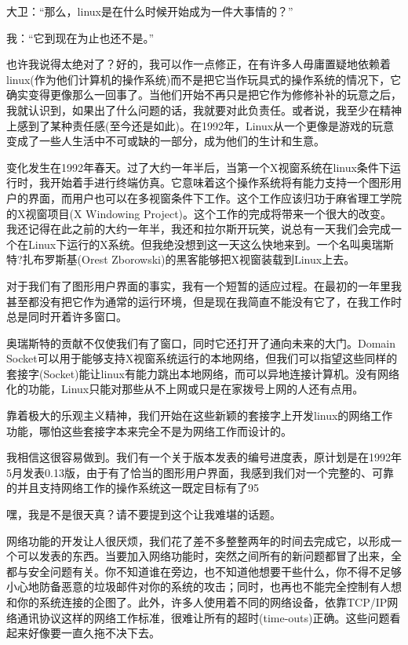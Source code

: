 大卫：“那么，linux是在什么时候开始成为一件大事情的？”

我：“它到现在为止也还不是。”

 

也许我说得太绝对了？好的，我可以作一点修正，在有许多人毋庸置疑地依赖着linux(作为他们计算机的操作系统)而不是把它当作玩具式的操作系统的情况下，它确实变得更像那么一回事了。当他们开始不再只是把它作为修修补补的玩意之后，我就认识到，如果出了什么问题的话，我就要对此负责任。或者说，我至少在精神上感到了某种责任感(至今还是如此)。在1992年，Linux从一个更像是游戏的玩意变成了一些人生活中不可或缺的一部分，成为他们的生计和生意。

 

变化发生在1992年春天。过了大约一年半后，当第一个X视窗系统在linux条件下运行时，我开始着手进行终端仿真。它意味着这个操作系统将有能力支持一个图形用户的界面，而用户也可以在多视窗条件下工作。这个工作应该归功于麻省理工学院的X视窗项目(X Windowing Project)。这个工作的完成将带来一个很大的改变。我还记得在此之前的大约一年半，我还和拉尔斯开玩笑，说总有一天我们会完成一个在Linux下运行的X系统。但我绝没想到这一天这么快地来到。一个名叫奥瑞斯特?扎布罗斯基(Orest Zborowski)的黑客能够把X视窗装载到Linux上去。

对于我们有了图形用户界面的事实，我有一个短暂的适应过程。在最初的一年里我甚至都没有把它作为通常的运行环境，但是现在我简直不能没有它了，在我工作时总是同时开着许多窗口。

奥瑞斯特的贡献不仅使我们有了窗口，同时它还打开了通向未来的大门。Domain Socket可以用于能够支持X视窗系统运行的本地网络，但我们可以指望这些同样的套接字(Socket)能让linux有能力跳出本地网络，而可以异地连接计算机。没有网络化的功能，Linux只能对那些从不上网或只是在家拨号上网的人还有点用。

靠着极大的乐观主义精神，我们开始在这些新颖的套接字上开发linux的网络工作功能，哪怕这些套接字本来完全不是为网络工作而设计的。

 

我相信这很容易做到。我们有一个关于版本发表的编号进度表，原计划是在1992年5月发表0.13版，由于有了恰当的图形用户界面，我感到我们对一个完整的、可靠的并且支持网络工作的操作系统这一既定目标有了95%

嘿，我是不是很天真？请不要提到这个让我难堪的话题。

网络功能的开发让人很厌烦，我们花了差不多整整两年的时间去完成它，以形成一个可以发表的东西。当要加入网络功能时，突然之间所有的新问题都冒了出来，全都与安全问题有关。你不知道谁在旁边，也不知道他想要干些什么，你不得不足够小心地防备恶意的垃圾邮件对你的系统的攻击；同时，也再也不能完全控制有人想和你的系统连接的企图了。此外，许多人使用着不同的网络设备，依靠TCP/IP网络通讯协议这样的网络工作标准，很难让所有的超时(time-outs)正确。这些问题看起来好像要一直久拖不决下去。

